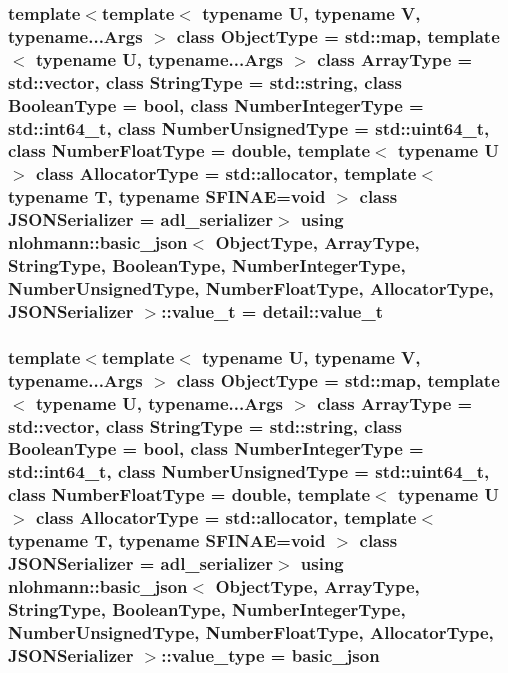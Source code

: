 \subsubsection[{\texorpdfstring{value\+\_\+t}{value_t}}]{\setlength{\rightskip}{0pt plus 5cm}template$<$template$<$ typename U, typename V, typename...\+Args $>$ class Object\+Type = std\+::map, template$<$ typename U, typename...\+Args $>$ class Array\+Type = std\+::vector, class String\+Type  = std\+::string, class Boolean\+Type  = bool, class Number\+Integer\+Type  = std\+::int64\+\_\+t, class Number\+Unsigned\+Type  = std\+::uint64\+\_\+t, class Number\+Float\+Type  = double, template$<$ typename U $>$ class Allocator\+Type = std\+::allocator, template$<$ typename T, typename S\+F\+I\+N\+A\+E=void $>$ class J\+S\+O\+N\+Serializer = adl\+\_\+serializer$>$ using {\bf nlohmann\+::basic\+\_\+json}$<$ Object\+Type, Array\+Type, String\+Type, Boolean\+Type, Number\+Integer\+Type, Number\+Unsigned\+Type, Number\+Float\+Type, Allocator\+Type, J\+S\+O\+N\+Serializer $>$\+::{\bf value\+\_\+t} =  {\bf detail\+::value\+\_\+t}}\hypertarget{classnlohmann_1_1basic__json_ae8cbef097f7da18a781fc86587de6b90}{}\label{classnlohmann_1_1basic__json_ae8cbef097f7da18a781fc86587de6b90}
\subsubsection[{\texorpdfstring{value\+\_\+type}{value_type}}]{\setlength{\rightskip}{0pt plus 5cm}template$<$template$<$ typename U, typename V, typename...\+Args $>$ class Object\+Type = std\+::map, template$<$ typename U, typename...\+Args $>$ class Array\+Type = std\+::vector, class String\+Type  = std\+::string, class Boolean\+Type  = bool, class Number\+Integer\+Type  = std\+::int64\+\_\+t, class Number\+Unsigned\+Type  = std\+::uint64\+\_\+t, class Number\+Float\+Type  = double, template$<$ typename U $>$ class Allocator\+Type = std\+::allocator, template$<$ typename T, typename S\+F\+I\+N\+A\+E=void $>$ class J\+S\+O\+N\+Serializer = adl\+\_\+serializer$>$ using {\bf nlohmann\+::basic\+\_\+json}$<$ Object\+Type, Array\+Type, String\+Type, Boolean\+Type, Number\+Integer\+Type, Number\+Unsigned\+Type, Number\+Float\+Type, Allocator\+Type, J\+S\+O\+N\+Serializer $>$\+::{\bf value\+\_\+type} =  {\bf basic\+\_\+json}}\hypertarget{classnlohmann_1_1basic__json_a2b3297873b70c080837e8eedc4fec32f}{}\label{classnlohmann_1_1basic__json_a2b3297873b70c080837e8eedc4fec32f}


